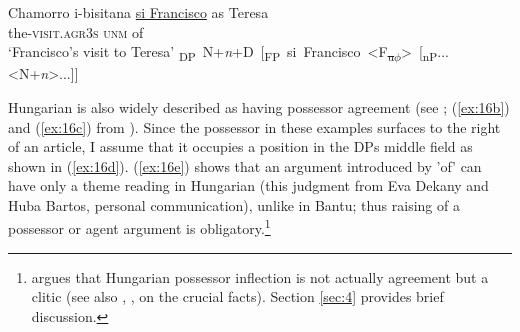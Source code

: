 \documentclass[output=paper
,modfonts
,nonflat]{langsci/langscibook}
\begin{document}
\begin{exe}
	\ex Chamorro \label{ex:15}
	\xlist
	\ex \label{ex:15a}
	\gll i-bisitana       \underline{si Francisco}   as Teresa \\
	the-\textsc{visit.agr3s}     \textsc{unm}            of\\
	\glt `Francisco's visit to Teresa'  	
	\ex \mbox{{\lbrack}\textsubscript{DP} N+\textit{n}+D [\textsubscript{FP} si Francisco  <F\textsubscript{\sout{u}}\textsubscript{\sout{$\phi$}}> [\textsubscript{nP}...<N+\textit{n}>...]]{\rbrack}}
	\endxlist
\end{exe}
Hungarian is also widely described as having possessor agreement (see \citealt{Szabolcsi1983, Szabolcsi1994}; (\ref{ex:16b}) and (\ref{ex:16c}) from \citealt[139]{Den_Dikken1999}). Since the possessor in these examples surfaces to the right of an article, I assume that it occupies a position in the DPs middle field as shown in (\ref{ex:16d}). (\ref{ex:16e}) shows that an argument introduced by 'of' can have only a theme reading in Hungarian (this judgment from Eva Dekany and Huba Bartos, personal communication), unlike in Bantu; thus raising of a possessor or agent argument is obligatory.\footnote{\citet{Den_Dikken2015} argues that Hungarian possessor inflection is not actually agreement but a clitic (see also \citealt{Den_Dikken1999}, \citealt{Bartos1999}, \citealt{Kiss2002} on the crucial facts). Section \ref{sec:4} provides brief discussion.} 
\end{document}
